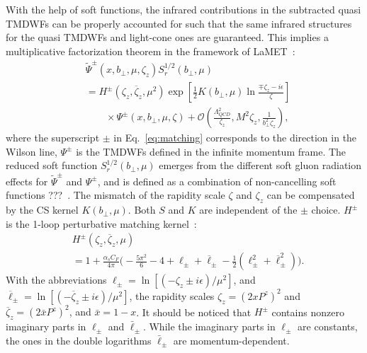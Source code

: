 \documentclass[prd,aps,twocolumn,preprintnumbers, showpacs, nofootinbib,superscriptaddress,notitlepage]{revtex4-1}
\newcommand\bl{\color{blue}}
\begin{document}
With the help of soft functions, the infrared contributions in the subtracted quasi TMDWFs can be properly accounted {\bl for} such that the same infrared structures {\bl for} the   quasi TMDWFs and light-cone ones are guaranteed. {\bl This implies} a multiplicative factorization theorem in the framework of LaMET~\cite{Ebert:2019okf,Ji:2019sxk,Ji:2019ewn,Ji:2021znw}:
\begin{align}
&\tilde \Psi^{\pm}(x, b_{\perp}, \mu, \zeta_z) S_r^{1/2}(b_{\perp}, \mu) \nonumber\\
&= H^{\pm}\left(\zeta_z, \overline\zeta_z, \mu^2\right) \exp\left[\frac{1}{2}K(b_{\perp},\mu)\ln\frac{\mp\zeta_z- i\epsilon}{\zeta} \right]  \nonumber\\
& \qquad\times \Psi^{\pm}(x, b_\perp, \mu, \zeta)+\mathcal{O}\left(\frac{\Lambda_{QCD}^2}{\zeta_z}, M^2\zeta_z,\frac{1}{b_{\perp}^2\zeta_z}\right),
\label{eq:matching}
\end{align}
where the superscript $\pm$ in Eq.~\eqref{eq:matching} corresponds to the direction in the Wilson line, $\Psi^{\pm}$ is the TMDWFs defined in the inﬁnite momentum frame. The reduced soft function $S^{1/2}_r(b_{\perp}, \mu)$ emerges from the different soft gluon radiation effects  {\bl for} $\tilde \Psi^{\pm}$ and $\Psi^{\pm}$, and {\bl is defined as a combination of non-cancelling soft functions ???}~\cite{Ji:2021znw}. The mismatch  of the rapidity scale $\zeta$ and $\zeta_z$ can be compensated by the CS kernel $K(b_{\perp},\mu)$. Both $S$ and $K$ are independent of the $\pm$ choice.  $H^{\pm}$ is the 1-loop perturbative matching kernel~\cite{Ji:2021znw}:
\begin{align}
& H^{\pm}(\zeta_z, \overline{\zeta}_z,\mu) \nonumber\\
& = 1+  \frac{ \alpha_s C_F}{4\pi} \bigg(-\frac{5\pi^2}{6}-4 +{\ell}_{\pm} + \overline \ell_{\pm} - \frac{1}{2} ({\ell}_{\pm}^2 + \overline \ell_{\pm}^2) \bigg).  \label{eq:1loophardkernel}
\end{align}
{\bl With the abbreviations} ${\ell}_{\pm} = \ln \left[(-\zeta_z \pm i\epsilon)/\mu^2\right]$, and $\overline {\ell}_{\pm} = \ln \left[(-\overline \zeta_z \pm i\epsilon)/\mu^2\right]$, {\bl the rapidity scales $\zeta_z = (2x P^z)^2$ and $\overline\zeta_z = \left(2\bar{x} P^z\right)^2$, and}  $\bar{x}=1-x$. It should be noticed that $H^{\pm}$ contains nonzero imaginary parts in $\ell_{\pm}$ and $\bar{\ell}_{\pm}$. While the imaginary parts in  $\ell_{\pm}$  are constants, the  ones in the double logarithms $\bar{\ell}_{\pm}$ are momentum-dependent.
\end{document}
